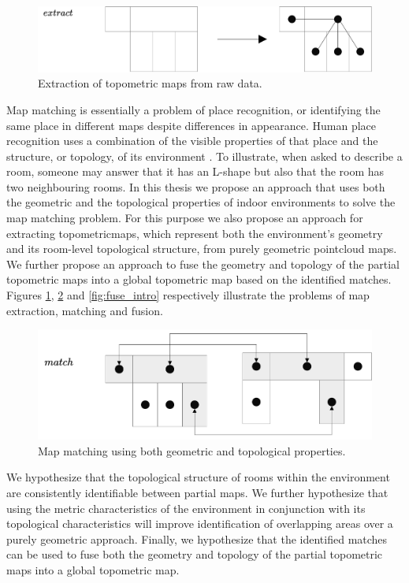 \begin{figure}[h]
    \centering
    \includegraphics*[width=.8\textwidth]{./fig/overview_diagrams-Page-2.drawio.pdf}
    \caption{Extraction of topometric maps from raw data.}
    \label{fig:extract_intro}
\end{figure}

Map matching is essentially a problem of place recognition, or identifying the same place in different maps despite differences in appearance. Human place recognition uses a combination of the visible properties of that place and the structure, or topology, of its environment \citep{kuipers_modeling_1978}. To illustrate, when asked to describe a room, someone may answer that it has an L-shape but also that the room has two neighbouring rooms. In this thesis we propose an approach that uses both the geometric and the topological properties of indoor environments to solve the map matching problem. For this purpose we also propose an approach for extracting \gls{topometricmap}s, which represent both the environment's geometry and its room-level topological structure, from purely geometric \gls{pointcloud} maps. We further propose an approach to fuse the geometry and topology of the partial topometric maps into a global topometric map based on the identified matches. Figures \ref{fig:extract_intro}, \ref{fig:match_intro} and \ref{fig:fuse_intro} respectively illustrate the problems of map extraction, matching and fusion.

\begin{figure}[h]
    \centering
    \includegraphics*[width=.7\textwidth]{./fig/overview_diagrams-Page-3.drawio.pdf}
    \caption{Map matching using both geometric and topological properties.}
    \label{fig:match_intro}

\end{figure}

We hypothesize that the topological structure of rooms within the environment are consistently identifiable between partial maps. We further hypothesize that using the metric characteristics of the environment in conjunction with its topological characteristics will improve identification of overlapping areas over a purely geometric approach. Finally, we hypothesize that the identified matches can be used to fuse both the geometry and topology of the partial topometric maps into a global topometric map.


